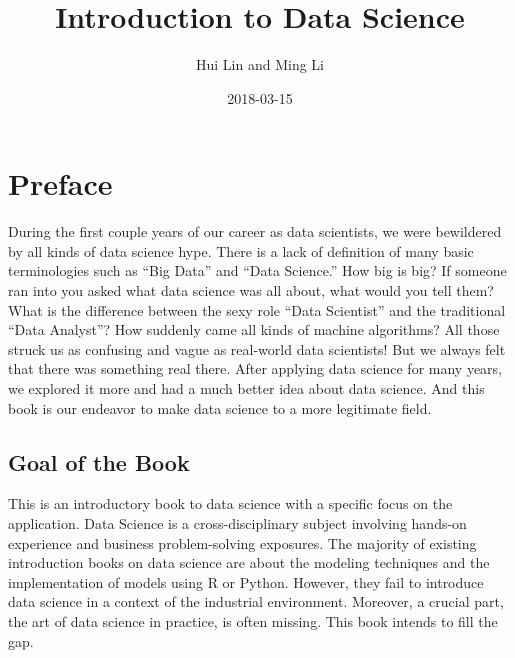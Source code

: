 \documentclass[12pt,]{krantz}
\title{Introduction to Data Science}
\author{Hui Lin and Ming Li}
\date{2018-03-15}
\theoremstyle{definition}
\theoremstyle{definition}
\theoremstyle{definition}
\theoremstyle{remark}
\begin{document}
\maketitle

\thispagestyle{empty}
\begin{center}
\end{center}

\setlength{\abovedisplayskip}{-5pt}
\setlength{\abovedisplayshortskip}{-5pt}

{
\hypersetup{linkcolor=black}
\setcounter{tocdepth}{2}
\tableofcontents
}
\listoftables
\listoffigures
\chapter*{Preface}\label{preface}


During the first couple years of our career as data scientists, we were
bewildered by all kinds of data science hype. There is a lack of
definition of many basic terminologies such as ``Big Data'' and ``Data
Science.'' How big is big? If someone ran into you asked what data
science was all about, what would you tell them? What is the difference
between the sexy role ``Data Scientist'' and the traditional ``Data
Analyst''? How suddenly came all kinds of machine algorithms? All those
struck us as confusing and vague as real-world data scientists! But we
always felt that there was something real there. After applying data
science for many years, we explored it more and had a much better idea
about data science. And this book is our endeavor to make data science
to a more legitimate field.

\section*{Goal of the Book}\label{goal-of-the-book}


This is an introductory book to data science with a specific focus on
the application. Data Science is a cross-disciplinary subject involving
hands-on experience and business problem-solving exposures. The majority
of existing introduction books on data science are about the modeling
techniques and the implementation of models using R or Python. However,
they fail to introduce data science in a context of the industrial
environment. Moreover, a crucial part, the art of data science in
practice, is often missing. This book intends to fill the gap.
\end{document}
